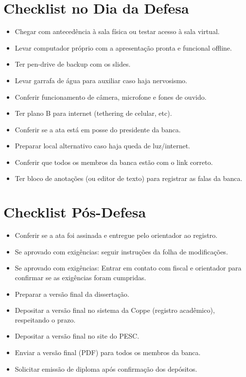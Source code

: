 \section{Checklist no Dia da Defesa}

\begin{itemize}[label=\(\square\),leftmargin=2em,nosep]
    \item  Chegar com antecedência à sala física ou testar acesso à sala virtual.
    \item  Levar computador próprio com a apresentação pronta e funcional offline.
    \item  Ter pen-drive de backup com os slides.
    \item  Levar garrafa de água para auxiliar caso haja nervosismo.
    \item  Conferir funcionamento de câmera, microfone e fones de ouvido.
    \item  Ter plano B para internet (tethering de celular, etc).
    \item  Conferir se a ata está em posse do presidente da banca.
    \item  Preparar local alternativo caso haja queda de luz/internet.
    \item  Conferir que todos os membros da banca estão com o link correto.
    \item  Ter bloco de anotações (ou editor de texto) para registrar as falas da banca.
\end{itemize}


\section{Checklist Pós-Defesa}

\begin{itemize}[label=\(\square\),leftmargin=2em,nosep]
    \item  Conferir se a ata foi assinada e entregue pelo orientador ao registro.
    \item  Se aprovado com exigências: seguir instruções da folha de modificações.
    \item Se aprovado com exigências: Entrar em contato com fiscal e orientador para confirmar se as exigências foram cumpridas.
    \item  Preparar a versão final da dissertação.
    \item  Depositar a versão final no sistema da Coppe (registro acadêmico), respeitando o prazo.
    \item  Depositar a versão final no site do PESC.
    \item  Enviar a versão final (PDF) para todos os membros da banca.
    \item  Solicitar emissão de diploma após confirmação dos depósitos.
\end{itemize}


